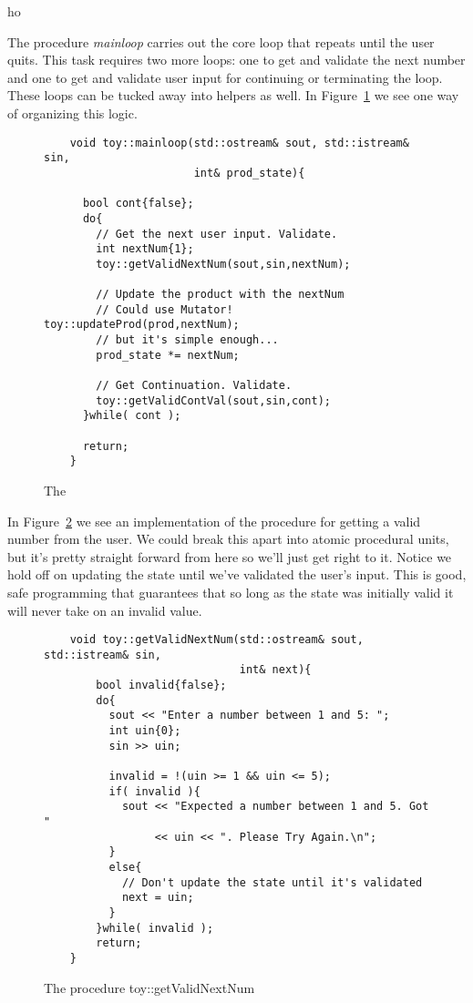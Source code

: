 ho\documentclass[]{tufte-handout}
\begin{document}
The procedure \textit{mainloop} carries out the core loop that repeats until the user quits. This task requires two more loops: one to get and validate the next number and one to get and validate user input for continuing or terminating the loop. These loops can be tucked away into helpers as well. In Figure~\ref{ex:mainloop} we see one way of organizing this logic.

\begin{figure}
  \begin{lstlisting}
    void toy::mainloop(std::ostream& sout, std::istream& sin,
                       int& prod_state){

      bool cont{false};
      do{
        // Get the next user input. Validate.
        int nextNum{1};
        toy::getValidNextNum(sout,sin,nextNum);

        // Update the product with the nextNum
        // Could use Mutator! toy::updateProd(prod,nextNum);
        // but it's simple enough...
        prod_state *= nextNum;

        // Get Continuation. Validate.
        toy::getValidContVal(sout,sin,cont);
      }while( cont );

      return;
    }
  \end{lstlisting}
\caption{The }
\label{ex:mainloop}
\end{figure}

In Figure~\ref{ex:validNum} we see an implementation of the procedure for getting a valid number from the user. We could break this apart into atomic procedural units, but it's pretty straight forward from here so we'll just get right to it. Notice we hold off on updating the state until we've validated the user's input. This is good, safe programming that guarantees that so long as the state was initially valid it will never take on an invalid value.

\begin{figure}
  \begin{lstlisting}
    void toy::getValidNextNum(std::ostream& sout, std::istream& sin,
                              int& next){
        bool invalid{false};
        do{
          sout << "Enter a number between 1 and 5: ";
          int uin{0};
          sin >> uin;

          invalid = !(uin >= 1 && uin <= 5);
          if( invalid ){
            sout << "Expected a number between 1 and 5. Got "
                 << uin << ". Please Try Again.\n";
          }
          else{
            // Don't update the state until it's validated
            next = uin;
          }
        }while( invalid );
        return;
    }
  \end{lstlisting}
  \caption{The procedure toy::getValidNextNum}
\label{ex:validNum}
\end{figure}
\end{document}
